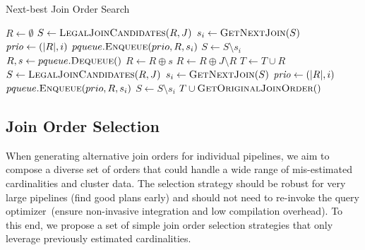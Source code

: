 \begin{algorithm}[!t]
\caption{Next-best Join Order Search}\label{alg:enumeration}
\begin{algorithmic}[1]
\State $R \gets \emptyset$
\State $S \gets \textsc{LegalJoinCandidates}(R, J)$ 
    \State $s_i \gets \textsc{GetNextJoin}(S)$
    \State $\mathit{prio} \gets (\lvert R\rvert, i)$
    \State $pqueue.\textsc{Enqueue}(prio, R, s_i)$
    \State $S \gets S \setminus s_i$
\EndFor
{}
    \State $R, s \gets pqueue.\textsc{Dequeue}()$ 
    \State $R \gets R \oplus s$
        \State $R \gets R \oplus J \setminus R$ 
        \State $T \gets T \cup R$
    \Else
        \State $S \gets \textsc{LegalJoinCandidates}(R, J)$
            \State $s_i \gets \textsc{GetNextJoin}(S)$
            \State $\mathit{prio} \gets (\lvert R\rvert, i)$
            \State $pqueue.\textsc{Enqueue}(prio, R, s_i)$
            \State $S \gets S \setminus s_i$
        \EndFor
    \EndIf
\EndWhile
\State \Return $T \cup \textsc{GetOriginalJoinOrder}()$
\end{algorithmic}
\end{algorithm}


\subsection{Join Order Selection}
\label{sec:paths}

When generating alternative join orders for individual pipelines, we aim to compose a diverse set of orders that could handle a wide range of mis-estimated cardinalities and cluster data. The selection strategy should be robust for very large pipelines (\ie find good plans early) and should not need to re-invoke the query optimizer~(\ie ensure non-invasive integration and low compilation overhead). To this end, we propose a set of simple join order selection strategies that only leverage previously estimated cardinalities. 

